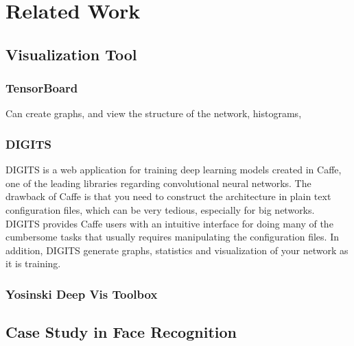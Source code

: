 
\chapter{Related Work}

\section{Visualization Tool}

\subsection{TensorBoard}

Can create graphs, and view the structure of the network, histograms, 

\subsection{DIGITS}

DIGITS is a web application for training deep learning models created in Caffe, one of the leading libraries regarding convolutional neural networks. The drawback of Caffe is that you need to construct the architecture in plain text configuration files, which can be very tedious, especially for big networks. DIGITS provides Caffe users with an intuitive interface for doing many of the cumbersome tasks that usually requires manipulating the configuration files. In addition, DIGITS generate graphs, statistics and visualization of your network as it is training.

\subsection{Yosinski Deep Vis Toolbox}

\section{Case Study in Face Recognition}

\cleardoublepage